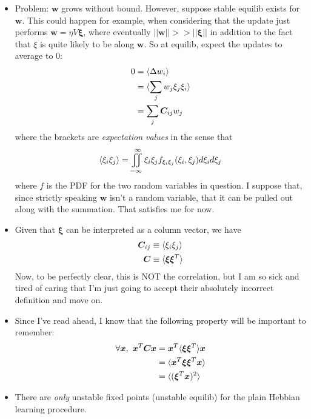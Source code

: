 \documentclass[12pt]{article}
\begin{document}
\begin{itemize}
\begin{itemize}
		\item Problem: $\bm{w}$ grows without bound. However, suppose stable equilib exists for $\bm{w}$. This could happen for example, when considering that the update just performs $\bm{w} = \eta V \bm{\xi}$, where eventually $||\bm{w}|| >> ||\bm{\xi}||$ in addition to the fact that $\xi$ is quite likely to be along $\bm{w}$. So at equilib, expect the updates to average to $0$:
		\begin{align}
			0 &= \corr{\Delta w_i} \\
			&= \corr{\sum_j w_j \xi_j \xi_i} \\
			&= \sum_j \matr[ij]{C} w_j
		\end{align}
		where the brackets are \textit{expectation values} in the sense that 
		\begin{align}
			\corr{\xi_i \xi_j} = \iint_{-\infty}^\infty \xi_i \xi_j f_{\xi_i \xi_j}(\xi_i, \xi_j) d\xi_i d\xi_j 
		\end{align}
		where $f$ is the PDF for the two random variables in question. I suppose that, since strictly speaking $\bm{w}$ isn't a random variable, that it can be pulled out along with the summation. That satisfies me for now. 
		\item Given that $\bm{\xi}$ can be interpreted as a column vector, we have
		\begin{align}
			\matr[ij]{C} &\equiv \corr{\xi_i \xi_j} \\
			\matr{C} &\equiv \corr{\bm{\xi}\bm{\xi}^T}
		\end{align}
		Now, to be perfectly clear, this is NOT the correlation, but I am so sick and tired of caring that I'm just going to accept their absolutely incorrect definition and move on. 
		\item Since I've read ahead, I know that the following property will be important to remember:
		\begin{align}
			\forall \bm{x},~ \bm{x}^T \matr{C} \bm{x} 
			&= \bm{x}^T \corr{\bm{\xi}\bm{\xi}^T}\bm{x} \\
			&= \corr{\bm{x}^T \bm{\xi}\bm{\xi}^T\bm{x}}\\
			&=  \corr{(\bm{\xi}^T\bm{x})^2}
		\end{align}
		\item There are \textit{only} unstable fixed points (unstable equilib) for the plain Hebbian learning procedure. 
		

\end{itemize}
\end{itemize}
\end{document}
